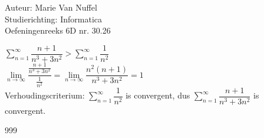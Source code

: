 \documentclass[a4paper]{article}
\newcommand{\llim}{\lim\limits}
\begin{document}
  
\noindent \large Auteur: Marie Van Nuffel \\
\noindent \large Studierichting: Informatica\\
\noindent \large Oefeningenreeks 6D nr. 30.26\\

\medskip

\normalsize

$\displaystyle\sum_{n=1}^{\infty}\dfrac{n+1}{n^3+3n^2} > \displaystyle\sum_{n=1}^{\infty}\dfrac{1}{n^2}$\\

$\llim_{n\rightarrow \infty}\dfrac{\tfrac{n+1}{n^3+3n^2}}{\tfrac{1}{n^2}} = \llim_{n\rightarrow \infty}\dfrac{n^2(n+1)}{n^3+3n^2} = 1$\\

Verhoudingscriterium:
$\displaystyle\sum_{n=1}^{\infty}\dfrac{1}{n^2}$ is convergent, dus $\displaystyle\sum_{n=1}^{\infty}\dfrac{n+1}{n^3+3n^2}$ is convergent.\\

			


\begin{thebibliography}{999}
\end{thebibliography}
\end{document}
